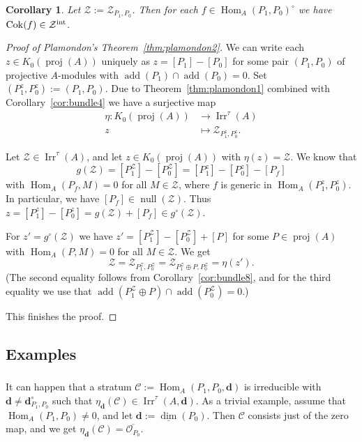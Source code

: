 \documentclass[12pt,reqno]{amsart}
\newtheorem{Cor}[Thm]{Corollary}
\theoremstyle{definition}
\newcommand{\df}{\colon}
\newcommand{\cC}{{\mathcal C}}
\newcommand{\cO}{{\mathcal O}}
\newcommand{\bd}{\mathbf{d}}
\newcommand{\add}{\operatorname{add}}
\newcommand{\dimv}{\underline{\dim}}
\newcommand{\zero}{\operatorname{null}}
\newcommand{\proj}{\operatorname{proj}}
\newcommand{\Hom}{\operatorname{Hom}}
\newcommand{\Coker}{\operatorname{Cok}}
\newcommand{\irr}{\operatorname{Irr}}
\newcommand{\calZ}{\mathcal{Z}}
\begin{document}
\begin{Cor}\label{cor:bundle7}
Let $\calZ := \calZ_{P_1,P_0}$.
Then for each $f \in \Hom_A(P_1,P_0)^\circ$ we have
$\Coker(f) \in \calZ^{\rm int}$.
\end{Cor}

\begin{proof}[{Proof of Plamondon's Theorem~\ref{thm:plamondon2}}]
We can write each $z \in K_0(\proj(A))$ uniquely as
$z = [P_1] - [P_0]$ for some pair $(P_1,P_0)$ of projective $A$-modules with $\add(P_1) \cap \add(P_0) = 0$.
Set $(P_1^z,P_0^z) := (P_1,P_0)$.
Due to Theorem~\ref{thm:plamondon1} combined with Corollary~\ref{cor:bundle4}
we have a surjective map
\begin{align*}
\eta\df K_0(\proj(A)) &\to \irr^\tau(A)
\\
z &\mapsto \calZ_{P_1^z,P_0^z}.
\end{align*}

Let $\calZ \in \irr^\tau(A)$, and let $z \in K_0(\proj(A))$
with $\eta(z) = \calZ$.
We know that
$$
g(\calZ) = [P_1^{\calZ}] - [P_0^{\calZ}] =
[P_1^z] - [P_0^z] - [P_f]
$$
with $\Hom_A(P_f,M) = 0$ for all $M \in \calZ$, where
$f$ is generic in $\Hom_A(P_1^z,P_0^z)$.
In particular, we have
$[P_f] \in \zero(\calZ)$.
Thus $z  = [P_1^z] - [P_0^z] = g(\calZ) + [P_f] \in g^\circ(\calZ)$.

For $z' = g^\circ(\calZ)$ we have
$z' = [P_1^\calZ] - [P_0^\calZ] + [P]$ for some
$P \in\proj(A)$ with $\Hom_A(P,M) = 0$ for all $M \in \calZ$.
We get
$$
\calZ = \calZ_{P_1^\calZ,P_0^\calZ} = \calZ_{P_1^\calZ \oplus P,P_0^\calZ} = \eta(z').
$$
(The second equality follows from Corollary~\ref{cor:bundle8}, and for the third equality we use that $\add(P_1^\calZ \oplus P) \cap \add(P_0^\calZ) = 0$.)

This finishes the proof.
\end{proof}

\subsection{Examples}

\subsubsection{}
It can happen that a stratum $\cC := \Hom_A(P_1,P_0,\bd)$ is
irreducible with $\bd \not= \bd_{P_1,P_0}^\circ$ such
that $\eta_\bd(\cC) \in \irr^\tau(A,\bd)$.
As  a trivial example, assume that $\Hom_A(P_1,P_0) \not= 0$, and let $\bd := \dimv(P_0)$.
Then $\cC$ consists just of the zero map, and we get $\eta_\bd(\cC) = \overline{\cO_{P_0}}$.
\end{document}
